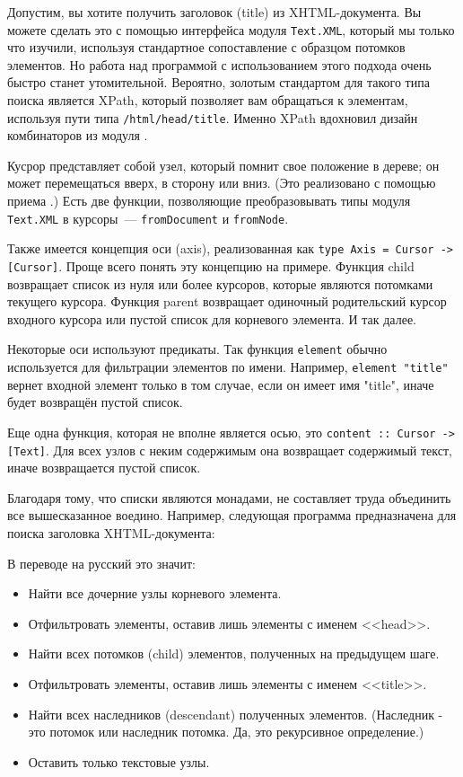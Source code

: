 Допустим, вы хотите получить заголовок (title) из XHTML-документа. Вы можете сделать это с помощью интерфейса модуля \lstinline!Text.XML!, который мы только что изучили, используя стандартное сопоставление с образцом потомков элементов. Но работа над программой с использованием этого подхода очень быстро станет утомительной. Вероятно, золотым стандартом для такого типа поиска является XPath, который позволяет вам обращаться к элементам, используя пути типа \lstinline!/html/head/title!. Именно XPath вдохновил дизайн комбинаторов из модуля .

Кусрор представляет собой узел, который помнит свое положение в дереве; он может перемещаться вверх, в сторону или вниз. (Это реализовано с помощью приема .) Есть две функции, позволяющие преобразовывать типы модуля \lstinline!Text.XML! в курсоры~--- \lstinline!fromDocument! и \lstinline!fromNode!.

Также имеется концепция оси (axis), реализованная как \lstinline!type Axis = Cursor -> [Cursor]!. Проще всего понять эту концепцию на примере. Функция child возвращает список из нуля или более курсоров, которые являются потомками текущего курсора. Функция parent возвращает одиночный родительский курсор входного курсора или пустой список для корневого элемента. И так далее.

Некоторые оси используют предикаты. Так функция \lstinline!element! обычно используется для фильтрации элементов по имени. Например, \lstinline!element "title"! вернет входной элемент только в том случае, если он имеет имя "title", иначе будет возвращён пустой список.

Еще одна функция, которая не вполне является осью, это \lstinline!content :: Cursor -> [Text]!. Для всех узлов с неким содержимым она возвращает содержимый текст, иначе возвращается пустой список.

Благодаря тому, что списки являются монадами, не составляет труда объединить все вышесказанное воедино. Например, следующая программа предназначена для поиска заголовка XHTML-документа:



В переводе на русский это значит:
\begin{itemize}
\item Найти все дочерние узлы корневого элемента.
\item Отфильтровать элементы, оставив лишь элементы с именем <<head>>.
\item Найти всех потомков (child) элементов, полученных на предыдущем шаге.
\item Отфильтровать элементы, оставив лишь элементы с именем <<title>>.
\item Найти всех наследников (descendant) полученных элементов. (Наследник - это потомок или наследник потомка. Да, это рекурсивное определение.)
\item Оставить только текстовые узлы.
\end{itemize}

